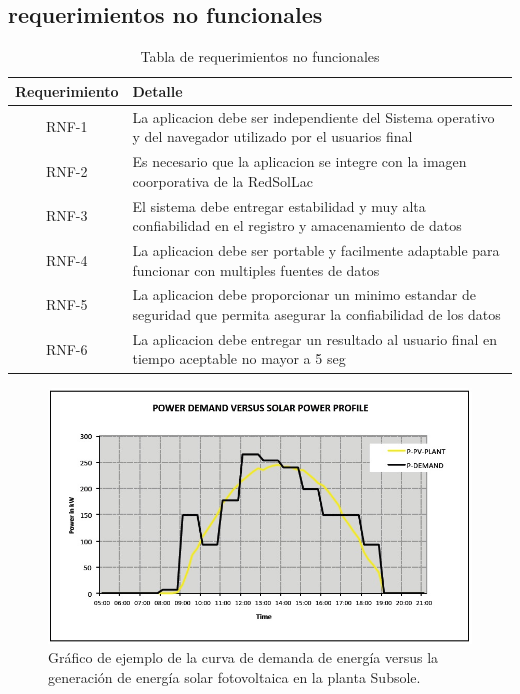\subsection{requerimientos no funcionales}
\begin{table}[h!]
\caption{Tabla de requerimientos no funcionales}
\begin{tabular}{| c | p{11cm} |}
	\hline
	\textbf{Requerimiento}	&	\textbf{Detalle}	\\
	\hline
	RNF-1	&	La aplicacion debe ser independiente del Sistema operativo y del navegador utilizado por el usuarios final	\\
	\hline
	RNF-2	&	Es necesario que la aplicacion se integre con la imagen coorporativa de la RedSolLac	\\
	\hline
	RNF-3	&	El sistema debe entregar estabilidad y muy alta confiabilidad en el registro y amacenamiento de datos	\\
	\hline
	RNF-4	&	La aplicacion debe ser portable y facilmente adaptable para funcionar con multiples fuentes de datos 	\\
	\hline
	RNF-5	&	La aplicacion debe proporcionar un minimo estandar de seguridad que permita asegurar la confiabilidad de los datos	\\
	\hline
	RNF-6	&	La aplicacion debe entregar un resultado al usuario final en tiempo aceptable no mayor a 5 seg	\\
	\hline
\end{tabular}
\end{table}

\begin{figure}[h!]
        \centering
        \includegraphics[scale=0.5]{images/demandaGeneracionSubSole}
        \caption{Gráfico de ejemplo de la curva de demanda de energía versus la generación de energía solar fotovoltaica en la planta Subsole.}
	\label{fig:demanda}
\end{figure}
